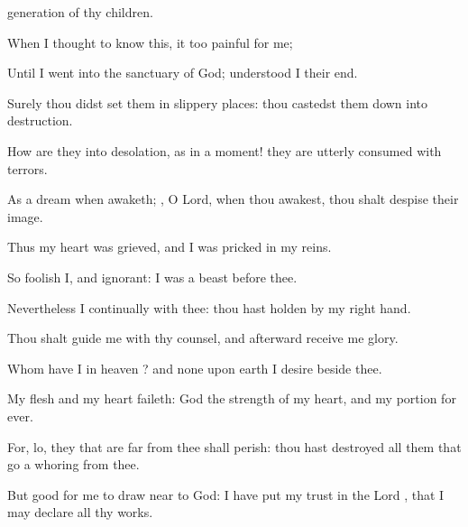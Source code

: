 {generation of thy
children.
\par }{\Q {}When I
thought to
know this, it
{} too
painful for
me;
\par }{\Q {}Until I
went into the
sanctuary of
God;
{}
understood I their
end.
\par }{\Q {}Surely thou didst
set them in slippery
places: thou castedst them
down into
destruction.
\par }{\Q {}How are they
{} into
desolation, as in a
moment! they are
utterly
consumed with
terrors.
\par }{\Q {}As a
dream when
{}
awaketh;
{}, O
Lord, when thou
awakest, thou shalt
despise their
image.
\par }{\BB \par }{\Q {}Thus my
heart was
grieved, and I was
pricked in my
reins.
\par }{\Q {}So
foolish
{} I, and
ignorant: I was
{} a
beast before thee.
\par }{\Q {}Nevertheless I
{}
continually with thee: thou hast
holden
{} by my
right
hand.
\par }{\Q {}Thou shalt
guide me with thy
counsel, and
afterward
receive me
{}
glory.
\par }{\Q {}Whom have I in
heaven
{}? and
{} none upon
earth
{} I
desire beside thee.
\par }{\Q {}My
flesh and my
heart
faileth:
{}
God
{} the
strength of my
heart, and my
portion for
ever.
\par }{\Q {}For, lo, they that are
far from thee shall
perish: thou hast
destroyed all them that go a
whoring from thee.
\par }{\Q {}But
{}
good for me to draw
near to
God: I have
put my
trust in the
Lord
{}, that I may
declare all thy
works.

}
